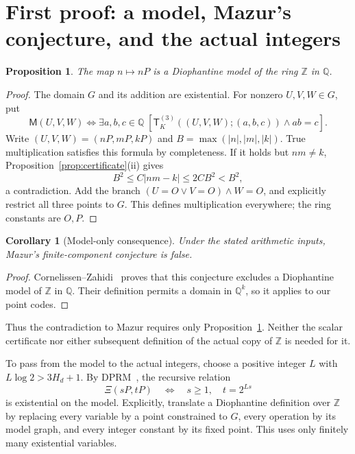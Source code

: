 \documentclass[11pt]{article}
\newtheorem{proposition}[theorem]{Proposition}
\newtheorem{corollary}[theorem]{Corollary}
\theoremstyle{definition}\newtheorem{inputthm}[theorem]{Hypothesis}
\theoremstyle{remark}\newtheorem{remark}[theorem]{Remark}
\newcommand{\Q}{\mathbb Q}\newcommand{\Z}{\mathbb Z}
\begin{document}
\section{First proof: a model, Mazur's conjecture, and the actual integers}
\label{sec:model}

\begin{proposition}\label{prop:model}
The map $n\mapsto nP$ is a Diophantine model of the ring $\Z$ in $\Q$.
\end{proposition}
\begin{proof}
The domain $G$ and its addition are existential. For nonzero
$U,V,W\in G$, put
\[
 \mathsf M(U,V,W)\iff\exists a,b,c\in\Q\;
 [\mathsf T_K^{(3)}((U,V,W);(a,b,c))\land ab=c].
\]
Write $(U,V,W)=(nP,mP,kP)$ and $B=\max(|n|,|m|,|k|)$.
True multiplication satisfies this formula by completeness.
If it holds but $nm\ne k$, Proposition~\ref{prop:certificate}(ii)
gives
\[
 B^2\le C|nm-k|\le2CB^2<B^2,
\]
a contradiction. Add the branch $(U=O\lor V=O)\land W=O$,
and explicitly restrict all three points to $G$. This defines
multiplication everywhere; the ring constants are $O,P$.
\end{proof}

\begin{corollary}[Model-only consequence]\label{cor:mazur}
Under the stated arithmetic inputs, Mazur's finite-component conjecture
is false.
\end{corollary}
\begin{proof}
Cornelissen--Zahidi~\cite[Theorem~3.6]{CZ} proves that this conjecture
excludes a Diophantine model of $\Z$ in $\Q$. Their definition permits
a domain in $\Q^k$, so it applies to our point codes.
\end{proof}

Thus the contradiction to Mazur requires only
Proposition~\ref{prop:model}. Neither the scalar certificate nor either
subsequent definition of the actual copy of $\Z$ is needed for it.

To pass from the model to the actual integers, choose a positive integer
$L$ with $L\log2>3H_d+1$. By DPRM~\cite{DPR,Matiyasevich}, the
recursive relation
\[
 \Xi(sP,tP)\quad\Longleftrightarrow\quad s\ge1,\quad t=2^{Ls}
\]
is existential on the model. Explicitly, translate a Diophantine
definition over $\Z$ by replacing every variable by a point constrained
to $G$, every operation by its model graph, and every integer constant
by its fixed point. This uses only finitely many existential variables.
\end{document}
